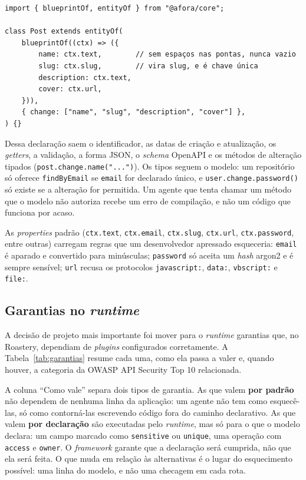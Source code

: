 \documentclass[a4paper,12pt]{article}
\newcommand{\estr}[1]{\textit{#1}}
\begin{document}
\begin{lstlisting}[float=htbp,caption={O mesmo \texttt{Post} declarado no afora.},label={lst:afora}]
import { blueprintOf, entityOf } from "@afora/core";

class Post extends entityOf(
    blueprintOf((ctx) => ({
        name: ctx.text,        // sem espaços nas pontas, nunca vazio
        slug: ctx.slug,        // vira slug, e é chave única
        description: ctx.text,
        cover: ctx.url,
    })),
    { change: ["name", "slug", "description", "cover"] },
) {}
\end{lstlisting}

Dessa declaração saem o identificador, as datas de criação e atualização, os \estr{getters}, a validação, a forma JSON, o \estr{schema} OpenAPI e os métodos de alteração tipados (\texttt{post.change.name("...")}). Os tipos seguem o modelo: um repositório só oferece \texttt{findByEmail} se \texttt{email} for declarado único, e \texttt{user.change.password()} só existe se a alteração for permitida. Um agente que tenta chamar um método que o modelo não autoriza recebe um erro de compilação, e não um código que funciona por acaso.

As \estr{properties} padrão (\texttt{ctx.text}, \texttt{ctx.email}, \texttt{ctx.slug}, \texttt{ctx.url}, \texttt{ctx.password}, entre outras) carregam regras que um desenvolvedor apressado esqueceria: \texttt{email} é aparado e convertido para minúsculas; \texttt{password} só aceita um \estr{hash} argon2 e é sempre sensível; \texttt{url} recusa os protocolos \texttt{javascript:}, \texttt{data:}, \texttt{vbscript:} e \texttt{file:}.

\subsection{Garantias no \textit{runtime}}

A decisão de projeto mais importante foi mover para o \estr{runtime} garantias que, no Roastery, dependiam de \estr{plugins} configurados corretamente. A Tabela~\ref{tab:garantias} resume cada uma, como ela passa a valer e, quando houver, a categoria da OWASP API Security Top 10 \citep{owasp2023} relacionada.

A coluna ``Como vale'' separa dois tipos de garantia. As que valem \textbf{por padrão} não dependem de nenhuma linha da aplicação: um agente não tem como esquecê-las, só como contorná-las escrevendo código fora do caminho declarativo. As que valem \textbf{por declaração} são executadas pelo \estr{runtime}, mas só para o que o modelo declara: um campo marcado como \texttt{sensitive} ou \texttt{unique}, uma operação com \texttt{access} e \texttt{owner}. O \estr{framework} garante que a declaração será cumprida, não que ela será feita. O que muda em relação às alternativas é o lugar do esquecimento possível: uma linha do modelo, e não uma checagem em cada rota.
\end{document}
